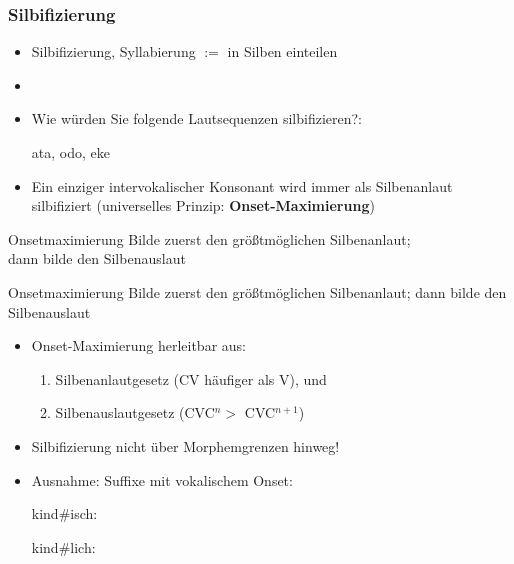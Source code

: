 \begin{frame}
\frametitle{Silbifizierung}

\begin{itemize}
	\item Silbifizierung, Syllabierung $:=$ in Silben einteilen
	\item[]
	\item Wie würden Sie folgende Lautsequenzen silbifizieren?:

	  \ea
          ata, odo, eke
          \z

\pause

	\item Ein einziger intervokalischer Konsonant wird immer als Silbenanlaut silbifiziert (universelles Prinzip: \textbf{Onset-Maximierung})
	
	
\end{itemize}

\begin{block}{Onsetmaximierung}
Bilde zuerst den größtmöglichen Silbenanlaut;\\ dann bilde den Silbenauslaut \citep[218]{Hall00a}
\end{block}

\end{frame}




\begin{frame}

\begin{block}{Onsetmaximierung}
Bilde zuerst den größtmöglichen Silbenanlaut; dann bilde den Silbenauslaut \citep[218]{Hall00a}
\end{block}


\begin{itemize}
	\item Onset-Maximierung herleitbar aus:
	\begin{enumerate}
		\item Silbenanlautgesetz (CV häufiger als V), und
		\item Silbenauslautgesetz (CVC$^{n} >$ CVC$^{n+1}$)
	\end{enumerate}

\pause
	\item Silbifizierung nicht über Morphemgrenzen hinweg! 
	\item Ausnahme: Suffixe mit vokalischem Onset:
	
	  \ea
          kind\#isch: 
          \z
	
	  \ea
          kind\#lich: \textipa{[kInt.lI\c{c}]}
          \z


	
\end{itemize}

\end{frame}


